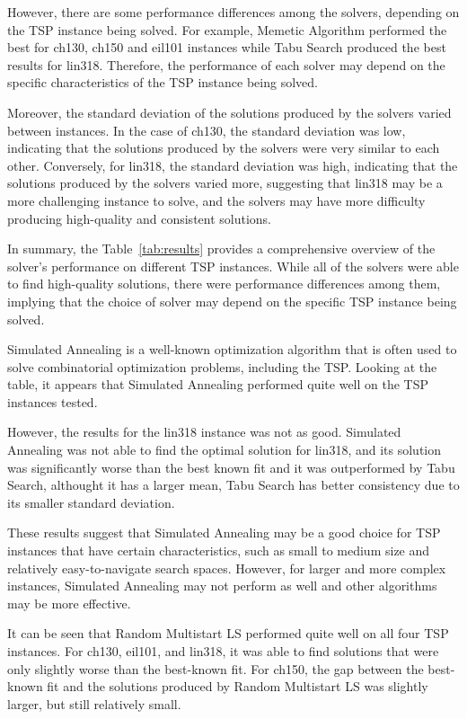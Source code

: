 \documentclass[conference]{IEEEtran}
\begin{document}
    However, there are some performance differences among the solvers, depending on the TSP instance being solved. For example, Memetic Algorithm performed the best for ch130, ch150 and eil101 instances while Tabu Search produced the best results for lin318. Therefore, the performance of each solver may depend on the specific characteristics of the TSP instance being solved.

    Moreover, the standard deviation of the solutions produced by the solvers varied between instances. In the case of ch130, the standard deviation was low, indicating that the solutions produced by the solvers were very similar to each other. Conversely, for lin318, the standard deviation was high, indicating that the solutions produced by the solvers varied more, suggesting that lin318 may be a more challenging instance to solve, and the solvers may have more difficulty producing high-quality and consistent solutions.

    In summary, the Table~\ref{tab:results} provides a comprehensive overview of the solver's performance on different TSP instances. While all of the solvers were able to find high-quality solutions, there were performance differences among them, implying that the choice of solver may depend on the specific TSP instance being solved.

    Simulated Annealing is a well-known optimization algorithm that is often used to solve combinatorial optimization problems, including the TSP. Looking at the table, it appears that Simulated Annealing performed quite well on the TSP instances tested.

    However, the results for the lin318 instance was not as good. Simulated Annealing was not able to find the optimal solution for lin318, and its solution was significantly worse than the best known fit and it was outperformed by Tabu Search, althought it has a larger mean, Tabu Search has better consistency due to its smaller standard deviation.

    These results suggest that Simulated Annealing may be a good choice for TSP instances that have certain characteristics, such as small to medium size and relatively easy-to-navigate search spaces. However, for larger and more complex instances, Simulated Annealing may not perform as well and other algorithms may be more effective.

    It can be seen that Random Multistart LS performed quite well on all four TSP instances. For ch130, eil101, and lin318, it was able to find solutions that were only slightly worse than the best-known fit. For ch150, the gap between the best-known fit and the solutions produced by Random Multistart LS was slightly larger, but still relatively small.
\end{document}
